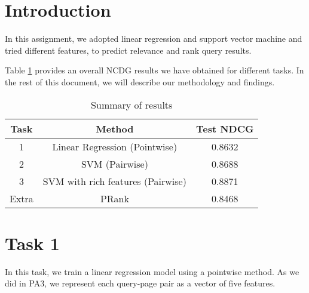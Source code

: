 
\usepackage{graphicx,amssymb,amsmath,enumerate}
\usepackage{courier}
\usepackage{color}
\usepackage{listings}
\usepackage{fancyvrb}
\usepackage{stmaryrd}

\oddsidemargin 0in
\evensidemargin 0in
\textwidth 6.5in
\topmargin -0.5in
\textheight 9.0in




\pagestyle{myheadings}  %

\section*{Introduction}
In this assignment, we adopted linear regression and support vector machine and tried different features, to predict relevance and rank query results. 

Table \ref{tab:all} provides an overall NCDG results we have obtained for different tasks. In the rest of this document,
we will describe our methodology and findings.
\begin{table}[h!]
\begin{center}
\begin{tabular}{|c|c|c|}
  \hline
  Task & Method & Test NDCG \\\hline
  1 &  Linear Regression (Pointwise) & 0.8632 \\\hline
  2 & SVM (Pairwise)  & 0.8688 \\\hline
  3 & SVM with rich features (Pairwise)  & 0.8871 \\ \hline
  Extra & PRank & 0.8468   \\\hline
\end{tabular}
\caption{Summary of results}\label{tab:all}
\end{center}
\end{table}

\section*{Task 1}
In this task, we train a linear regression model using a pointwise method. 
As we did in PA3, we represent each query-page pair as a vector of five features. 

